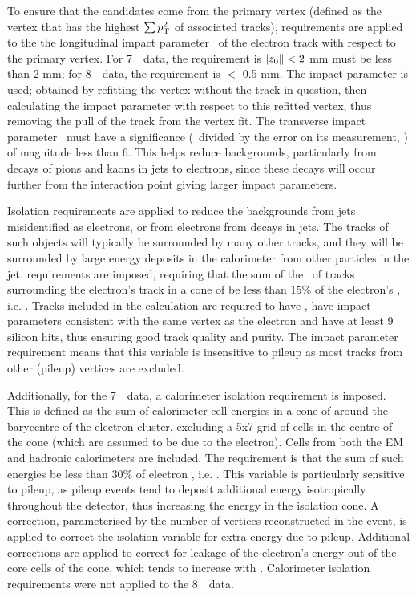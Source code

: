 To ensure that the candidates come from the primary vertex (defined as the
vertex that has the highest $\sum{\ensuremath{p_{\mathrm{T}}}^2}$ of associated tracks), requirements
are applied to the the
longitudinal impact parameter \zzero\ of the electron track with respect to the
primary vertex. For 7~\tev\ data, the requirement is $|z_{0}\|<2$ mm must be
less than 2 mm; for 8~\tev\ data,
the requirement is \zzerosintheta $<$ 0.5 mm. The  impact
parameter is used; obtained by refitting the vertex without the track in
question, then calculating the impact parameter with respect to this refitted
vertex, thus removing the pull of the track from the vertex fit.  The transverse
impact parameter \dzero\ must have a significance (\dzero\ divided by the error
on its measurement, \dzerosig) of magnitude less than 6. This helps reduce backgrounds,
particularly from decays of pions and kaons in jets to electrons, since these
decays will occur further from the interaction point giving larger impact
parameters.

Isolation requirements are applied to reduce the backgrounds from jets 
misidentified as electrons, or from electrons from decays in jets. The tracks of
such objects will
typically be surrounded by many other tracks, and they will be
surrounded by large energy deposits in the calorimeter from other particles in
the jet.  requirements are imposed, requiring that the
sum of the \pt\ of tracks surrounding the electron's track in a cone of
 be less than 15\% of the electron's \pt, i.e.
. Tracks included in the calculation are required to have
, have impact parameters consistent with the same vertex as the
electron and have at least 9 silicon hits, thus ensuring good track quality and
purity. The impact parameter requirement means that this variable is insensitive
to pileup as most tracks from other (pileup) vertices are excluded.

Additionally, for the 7~\tev\ data, a calorimeter isolation requirement is imposed.
This is defined as the sum of calorimeter cell energies in a cone of
 around the barycentre of the electron cluster, excluding a 5x7
grid of cells in the centre of the cone (which are assumed to be due to the
electron). Cells from both the EM and hadronic calorimeters are included. The
requirement is that the sum of such energies be less than 30\% of electron \et,
i.e. .  This variable is particularly sensitive to pileup,
as pileup events tend to deposit additional energy isotropically throughout the
detector, thus increasing the energy in the isolation cone. A correction,
parameterised by the number of vertices reconstructed in the event, is applied to
correct the isolation variable for extra energy due to pileup.  Additional
corrections are applied to correct for leakage of the electron's energy out of
the core cells of the cone, which tends to increase with \pt. Calorimeter
isolation requirements were not applied to the 8~\tev\ data.


